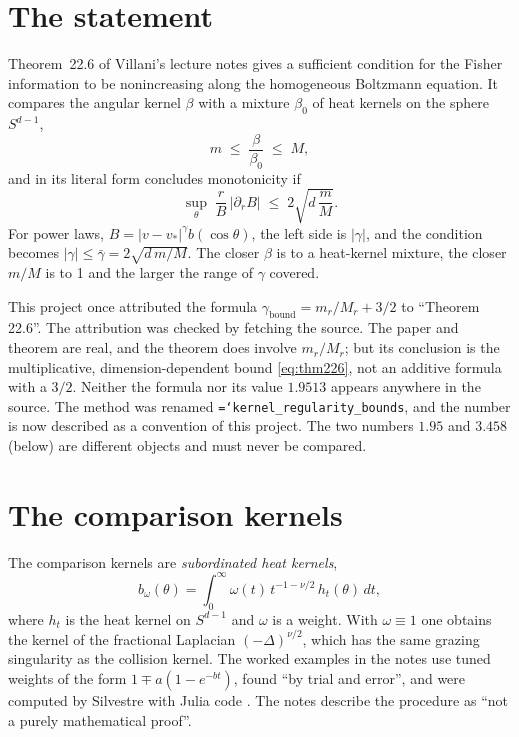 \documentclass[11pt,a4paper,openany]{book}
\newcommand{\code}[1]{\texttt{\hyphenchar\font=`\-\relax #1}}
\theoremstyle{definition}
\theoremstyle{plain}
\begin{document}
\section{The statement}

Theorem~22.6 of Villani's lecture notes \cite{villani2025} gives a sufficient condition for the
Fisher information to be nonincreasing along the homogeneous Boltzmann equation. It compares the
angular kernel $\beta$ with a mixture $\beta_0$ of heat kernels on the sphere $S^{d-1}$,
\[
  m\;\le\;\frac{\beta}{\beta_0}\;\le\;M,
\]
and in its literal form concludes monotonicity if
\begin{equation}
  \sup_\theta\;\frac rB\,|\partial_rB|\;\le\;2\sqrt{d\,\frac mM}.
  \label{eq:thm226}
\end{equation}
For power laws, $B=|v-v_*|^\gamma b(\cos\theta)$, the left side is $|\gamma|$, and the condition
becomes $|\gamma|\le\bar\gamma=2\sqrt{d\,m/M}$. The closer $\beta$ is to a heat-kernel mixture,
the closer $m/M$ is to 1 and the larger the range of $\gamma$ covered.

\begin{lesson}
This project once attributed the formula $\gamma_{\text{bound}}=m_r/M_r+3/2$ to ``Theorem 22.6''.
The attribution was checked by fetching the source. The paper and theorem are real, and the
theorem does involve $m_r/M_r$; but its conclusion is the multiplicative, dimension-dependent
bound \eqref{eq:thm226}, not an additive formula with a $3/2$. Neither the formula nor its value
$1.9513$ appears anywhere in the source. The method was renamed \code{kernel\_regularity\_bounds},
and the number is now described as a convention of this project. The two numbers $1.95$ and
$3.458$ (below) are different objects and must never be compared.
\end{lesson}

\section{The comparison kernels}

The comparison kernels are \emph{subordinated heat kernels},
\[
  b_\omega(\theta)=\int_0^\infty\omega(t)\,t^{-1-\nu/2}\,h_t(\theta)\,dt,
\]
where $h_t$ is the heat kernel on $S^{d-1}$ and $\omega$ is a weight. With $\omega\equiv1$ one
obtains the kernel of the fractional Laplacian $(-\Delta)^{\nu/2}$, which has the same grazing
singularity as the collision kernel. The worked examples in the notes use tuned weights of the
form $1\mp a(1-e^{-bt})$, found ``by trial and error'', and were computed by Silvestre with Julia
code \cite{silvestre2024}. The notes describe the procedure as ``not a purely mathematical proof''.
\end{document}
